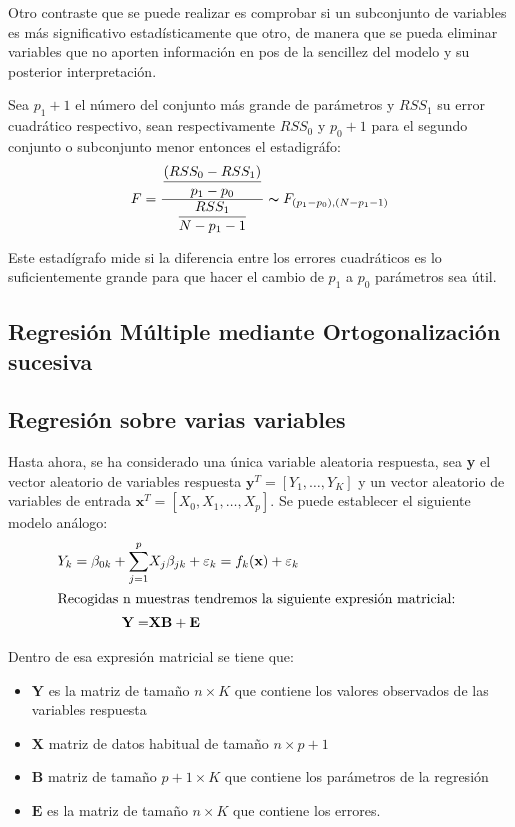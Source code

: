 \noindent Otro contraste que se puede realizar es comprobar si un subconjunto de variables es más significativo estadísticamente que otro, de manera que se pueda eliminar variables que no aporten información en pos de la sencillez del modelo y su posterior interpretación. 

\noindent Sea $p_1+1$ el número del conjunto más grande de parámetros y $RSS_1$ su error cuadrático respectivo, sean respectivamente $RSS_0$ y $p_0+1$ para el segundo conjunto o subconjunto menor entonces el estadigráfo:
\begin{equation}\label{ec.F}
F=\dfrac{\dfrac{(RSS_0-RSS_1)}{p_1-p_0}}{\dfrac{RSS_1}{N-p_1-1}} \thicksim F_{(p_1-p_0),(N-p_1-1)}
\end{equation}

\noindent Este estadígrafo mide si la diferencia entre los errores cuadráticos es lo suficientemente grande para que hacer el cambio de $p_1$ a $p_0$ parámetros sea útil. 

\subsection{Regresión Múltiple mediante Ortogonalización sucesiva }


\subsection{Regresión sobre varias variables}
\noindent Hasta ahora, se ha considerado una única variable aleatoria respuesta, sea \textbf{y} el vector aleatorio de variables respuesta $\textbf{y}^T=[Y_1,\ldots, Y_K]$ y un vector aleatorio de variables de entrada $\textbf{x}^T=[X_0, X_1,\ldots, X_p]$. Se puede establecer el siguiente modelo análogo:
\begin{align}
Y_k=\beta_{0k}+\sum_{j=1}^p& X_j\beta_{jk}+\varepsilon_k=f_k(\textbf{x})+\varepsilon_k\\
\intertext{Recogidas n muestras tendremos la siguiente expresión matricial: }
\textbf{Y}=&\textbf{X}\textbf{B}+\textbf{E}
\end{align}

\noindent Dentro de esa expresión matricial se tiene que: 
\begin{itemize}
\item $\textbf{Y}$ es la matriz de tamaño $n\times K$ que contiene los valores observados de las variables respuesta
\item $\textbf{X}$ matriz de datos habitual de tamaño $n \times p+1$ 
\item $\textbf{B}$ matriz de tamaño $ p+1 \times K$ que contiene los parámetros de la regresión 
\item $\textbf{E}$ es la matriz de tamaño $ n \times K$ que contiene los errores. 
\end{itemize}

